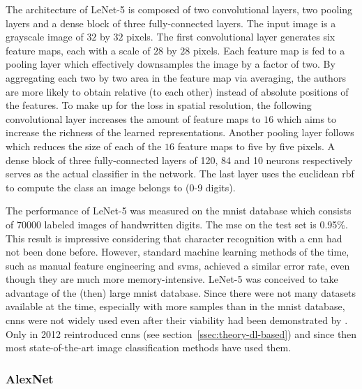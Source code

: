 \documentclass[final]{vutinfth} %
\begin{document}
The architecture of LeNet-5 is composed of two convolutional layers,
two pooling layers and a dense block of three fully-connected
layers. The input image is a grayscale image of $32$ by $32$
pixels. The first convolutional layer generates six feature maps, each
with a scale of $28$ by $28$ pixels. Each feature map is fed to a
pooling layer which effectively downsamples the image by a factor of
two. By aggregating each two by two area in the feature map via
averaging, the authors are more likely to obtain relative (to each
other) instead of absolute positions of the features. To make up for
the loss in spatial resolution, the following convolutional layer
increases the amount of feature maps to $16$ which aims to increase
the richness of the learned representations. Another pooling layer
follows which reduces the size of each of the $16$ feature maps to
five by five pixels. A dense block of three fully-connected layers of
120, 84 and 10 neurons respectively serves as the actual classifier in
the network. The last layer uses the euclidean \gls{rbf} to compute
the class an image belongs to (0-9 digits).

The performance of LeNet-5 was measured on the \gls{mnist} database
which consists of $70000$ labeled images of handwritten digits. The
\gls{mse} on the test set is 0.95\%. This result is impressive
considering that character recognition with a \gls{cnn} had not been
done before. However, standard machine learning methods of the time,
such as manual feature engineering and \glspl{svm}, achieved a similar
error rate, even though they are much more memory-intensive. LeNet-5
was conceived to take advantage of the (then) large \gls{mnist}
database. Since there were not many datasets available at the time,
especially with more samples than in the \gls{mnist} database,
\glspl{cnn} were not widely used even after their viability had been
demonstrated by \textcite{lecun1998}. Only in 2012
\textcite{krizhevsky2012} reintroduced \glspl{cnn} (see
section~\ref{ssec:theory-dl-based}) and since then most
state-of-the-art image classification methods have used them.

\subsubsection{AlexNet}
\label{sssec:theory-alexnet}
\end{document}
